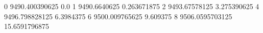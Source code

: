 0 9490.400390625 0.0
1 9490.6640625 0.263671875
2 9493.67578125 3.275390625
4 9496.798828125 6.3984375
6 9500.009765625 9.609375
8 9506.0595703125 15.6591796875
